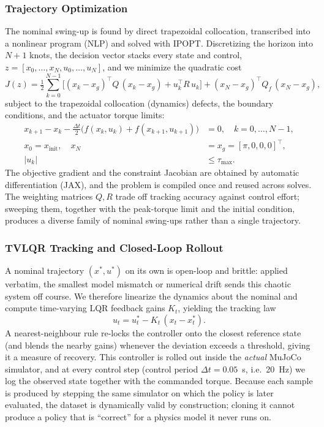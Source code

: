 \documentclass[11pt,a4paper]{article}
\begin{document}
\subsubsection{Trajectory Optimization}
The nominal swing-up is found by direct trapezoidal collocation, transcribed into a
nonlinear program (NLP) and solved with IPOPT. Discretizing the horizon into
$N+1$ knots, the decision vector stacks every state and control,
$z = [x_0, \ldots, x_N, u_0, \ldots, u_N]$, and we minimize the quadratic cost
\begin{equation}
  J(z) = \tfrac{1}{2}\sum_{k=0}^{N-1}
         \Big[(x_k - x_g)^\top Q\,(x_k - x_g) + u_k^\top R\,u_k\Big]
       + (x_N - x_g)^\top Q_f\,(x_N - x_g),
\end{equation}
subject to the trapezoidal collocation (dynamics) defects, the boundary
conditions, and the actuator torque limits:
\begin{align}
  x_{k+1} - x_k - \tfrac{\Delta t}{2}\big(f(x_k,u_k) + f(x_{k+1},u_{k+1})\big) &= 0,
    \quad k = 0,\ldots,N-1, \\
  x_0 = x_{\text{init}}, \quad x_N &= x_g = [\pi, 0, 0, 0]^\top, \\
  |u_k| &\le \tau_{\max}.
\end{align}
The objective gradient and the constraint Jacobian are obtained by automatic
differentiation (JAX), and the problem is compiled once and reused across solves.
The weighting matrices $Q, R$ trade off tracking accuracy against control effort;
sweeping them, together with the peak-torque limit and the initial condition,
produces a diverse family of nominal swing-ups rather than a single trajectory.

\subsubsection{TVLQR Tracking and Closed-Loop Rollout}
A nominal trajectory $(x^\ast, u^\ast)$ on its own is open-loop and brittle: applied
verbatim, the smallest model mismatch or numerical drift sends this chaotic system
off course. We therefore linearize the dynamics about the nominal and compute
time-varying LQR feedback gains $K_t$, yielding the tracking law
\begin{equation}
  u_t = u^\ast_t - K_t\,(x_t - x^\ast_t).
\end{equation}
A nearest-neighbour rule re-locks the controller onto the closest reference state
(and blends the nearby gains) whenever the deviation exceeds a threshold, giving it
a measure of recovery. This controller is rolled out inside the \emph{actual}
MuJoCo simulator, and at every control step (control period $\Delta t = 0.05$~s,
i.e.\ 20~Hz) we log the observed state together with the commanded torque. Because
each sample is produced by stepping the same simulator on which the policy is later
evaluated, the dataset is dynamically valid by construction; cloning it cannot
produce a policy that is ``correct'' for a physics model it never runs on.
\end{document}

